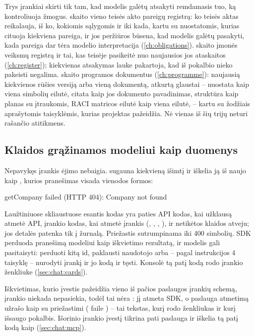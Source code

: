 Trys įrankiai skirti tik tam, kad modelis galėtų atsakyti remdamasis tuo, ką kontroliuoja žmogus.
 skaito vieno teisės akto pareigų registrą: ko teisės aktas reikalauja, iš
ko, kokiomis sąlygomis ir iki kada, kartu su nuostatomis, kurias cituoja kiekviena pareiga, ir jos
peržiūros būsena, kad modelis galėtų pasakyti, kada pareiga dar tėra modelio interpretacija
(\cref{ch:obligations}).  skaito įmonės veiksmų registrą ir tai, kas
teisėje pasikeitė nuo naujausios jos ataskaitos (\cref{ch:register}); kiekvienas atsakymas lauke
 pakartoja, kad iš pokalbio nieko pakeisti negalima.  skaito
programos dokumentus (\cref{ch:programme}): naujausią kiekvienos rūšies versiją arba vieną
dokumentą, atkurtą glaustai -- nuostata kaip viena simbolių eilutė, citata kaip jos dokumento
pavadinimas, struktūra kaip planas su įtraukomis, RACI matricos eilutė kaip viena eilutė, --
kartu su žodžiais aprašytomis taisyklėmis, kurias projektas pažeidžia. Nė vienas iš šių trijų
neturi rašančio atitikmens.

\subsection{Klaidos grąžinamos modeliui kaip duomenys}\label{sec:chat:toolerrors}

Nepavykęs įrankis ėjimo nebaigia.  sugauna kiekvieną išimtį ir iškelia ją iš
naujo kaip , kurios pranešimas visada vienodos formos:

\begin{codeblock}
 getCompany failed (HTTP 404): Company not found
\end{codeblock}

Laužtiniuose skliaustuose esantis kodas yra paties API kodas, kai užklausą atmetė API, įrankio
kodas, kai atmetė įrankis (, ,
, ), ir  netikėtos klaidos atveju; jos
detalės patenka tik į žurnalą. Priežastis sutrumpinama iki 400 simbolių. SDK perduoda pranešimą
modeliui kaip iškvietimo rezultatą, ir modelis gali pasitaisyti: perduoti kitą id, paklausti
naudotojo arba -- pagal instrukcijos 4 taisyklę -- nurodyti įrankį ir jo kodą ir tęsti. Konsolė tą
patį kodą rodo įrankio ženkliuke (\cref{sec:chat:cards}).

Iškvietimas, kurio įvestis pažeidžia vieno iš pačios paslaugos įrankių schemą, įrankio niekada
nepasiekia, todėl tai nėra : jį atmeta SDK, o paslauga atmetimą užrašo kaip
 su priežastimi ( faile ) --
tai tekstas, kurį rodo ženkliukas ir kurį išsaugo pokalbis. Išorinio įrankio įvestį tikrina pati
paslauga ir iškelia tą patį kodą kaip  (\cref{sec:chat:mcp}).


